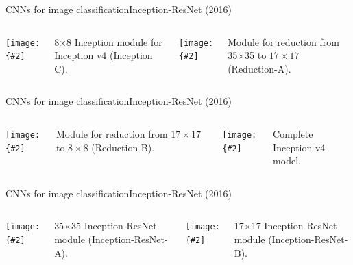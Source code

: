 \documentclass[aspectratio=169]{beamer}
\newcommand{\myfig}[3]{\centerline{\texttt{[image: \{\#2]}}}
\begin{document}
\begin{frame}{CNNs for image classification}{Inception-ResNet (2016)}

  \begin{columns}

    \column{2.2in}
    
    \myfig{2in}{szegedy-16-fig6}{Szegedy et at.\ (2017), Fig.\ 6}

    \medskip

    8$\times$8 Inception module for Inception v4 (Inception C).
    
    \column{2.2in}
    
    \myfig{2in}{szegedy-16-fig7}{Szegedy et at.\ (2017), Fig.\ 7}

    \medskip

    Module for reduction from 35$\times$35 to $17\times 17$ (Reduction-A).

  \end{columns}
  
\end{frame}


\begin{frame}{CNNs for image classification}{Inception-ResNet (2016)}

  \begin{columns}

    \column{2in}
    
    \myfig{2in}{szegedy-16-fig8}{Szegedy et at.\ (2017), Fig.\ 8}

    \medskip

    Module for reduction from $17\times 17$ to $8\times 8$ (Reduction-B).

    \column{1.1in}

    \myfig{0.9in}{szegedy-16-fig9}{Szegedy et at.\ (2017), Fig.\ 9}

    \column{1.4in}
  
    Complete Inception v4 model.

  \end{columns}
  
\end{frame}


\begin{frame}{CNNs for image classification}{Inception-ResNet (2016)}

  \begin{columns}

    \column{2in}
    
    \myfig{2in}{szegedy-16-fig10}{Szegedy et at.\ (2017), Fig.\ 10}

    \medskip

    35$\times$35 Inception ResNet module (Inception-ResNet-A).

    \column{2in}
    
    \myfig{1.6in}{szegedy-16-fig11}{Szegedy et at.\ (2017), Fig.\ 11}

    \medskip

    17$\times$17 Inception ResNet module (Inception-ResNet-B).

  \end{columns}
  
\end{frame}
\end{document}
